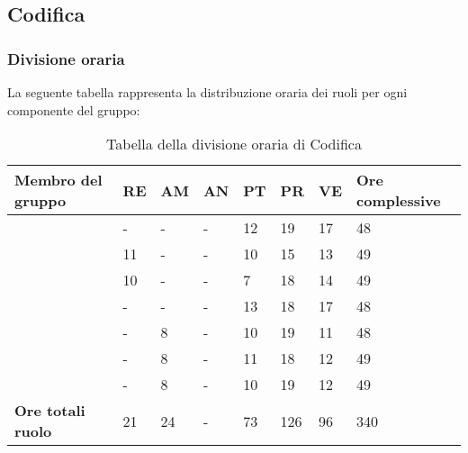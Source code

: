 \subsection{Codifica}

\subsubsection{Divisione oraria}
La seguente tabella rappresenta la distribuzione oraria dei ruoli per ogni componente del gruppo:
{
	\renewcommand{\arraystretch}{2}
	\begin{longtable}[h!] { C{4cm} C{1cm} C{1cm} C{1cm} C{1cm} C{1cm} C{1cm} C{3cm}}
	\caption{Tabella della divisione oraria di Codifica}\\
	\rowcolor{\primaryColor}
	
	\textcolor{\secondaryColor}{\textbf{Membro del gruppo}} & 
	\textcolor{\secondaryColor}{\textbf{RE}} & 
	\textcolor{\secondaryColor}{\textbf{AM}} & 
	\textcolor{\secondaryColor}{\textbf{AN}} & 
	\textcolor{\secondaryColor}{\textbf{PT}} & 
	\textcolor{\secondaryColor}{\textbf{PR}} & 
	\textcolor{\secondaryColor}{\textbf{VE}} & 
	\textcolor{\secondaryColor}{\textbf{Ore complessive}}\\	
	\endhead
	
	\AW{}                     & - & - & - & 12 & 19 & 17 & 48 \\
	\AT{}                     & 11 & - & - & 10 & 15 & 13 & 49 \\
	\AD{}                     & 10 & - & - & 7 & 18 & 14 & 49 \\
	\EC{}                     & - & - & - & 13 & 18 & 17 & 48 \\
	\EM{}                     & - & 8 & - & 10 & 19 & 11 & 48 \\
	\FP{}                     & - & 8 & - & 11 & 18 & 12 & 49 \\
	\GG{}                     & - & 8 & - & 10 & 19 & 12 & 49 \\
	\textbf{Ore totali ruolo} & 21 & 24 & - & 73 & 126 & 96 & 340\\
	
	\end{longtable}
}

